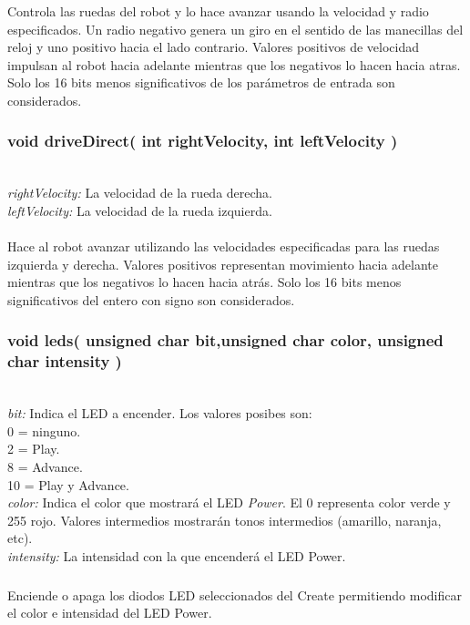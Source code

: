 \documentclass[letterpaper]{book}
\begin{document}
Controla las ruedas del robot y lo hace avanzar usando la velocidad y radio especificados. Un radio negativo genera un giro en el sentido de las manecillas del reloj y uno positivo hacia el lado contrario. Valores positivos de velocidad impulsan al robot hacia adelante mientras que los negativos lo hacen hacia atras. Solo los 16 bits menos significativos de los parámetros de entrada son considerados.\\

\subsubsection{void driveDirect( int rightVelocity, int leftVelocity )}\mbox{}\\
\emph{rightVelocity: }La velocidad de la rueda derecha.\\
\emph{leftVelocity: }La velocidad de la rueda izquierda.\\\\

Hace al robot avanzar utilizando las velocidades especificadas para las ruedas izquierda y derecha. Valores positivos representan movimiento hacia adelante mientras que los negativos lo hacen hacia atrás. Solo los 16 bits menos significativos del entero con signo son considerados.\\

\subsubsection{void leds( unsigned char bit,unsigned char color, unsigned char intensity )} \mbox{}\\
\emph{bit: }Indica el LED a encender. Los valores posibes son:\\
0 = ninguno.\\
2 = Play.\\
8 = Advance.\\
10 = Play y Advance.\\
\emph{color: } Indica el color que mostrará el LED \emph{Power}. El 0 representa color verde y 255 rojo. Valores intermedios mostrarán tonos intermedios (amarillo, naranja, etc).\\
\emph{intensity: }La intensidad con la que encenderá el LED Power.\\\\

Enciende o apaga los diodos LED seleccionados del Create\textsuperscript{\textregistered} permitiendo modificar el color e intensidad del LED Power.\\
\end{document}
